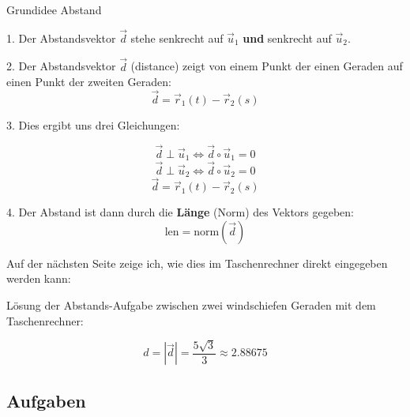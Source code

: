 \begin{rezept}{Grundidee Abstand}{}

  1. Der Abstandsvektor $\vec{d}$ stehe senkrecht auf $\vec{u}_1$
  \textbf{und} senkrecht auf $\vec{u}_2$.

  2. Der Abstandsvektor $\vec{d}$ (distance) zeigt von einem Punkt der einen Geraden auf
  einen Punkt der zweiten Geraden: $$\vec{d}=\vec{r}_1(t) - \vec{r}_2(s)$$

  3. Dies ergibt uns drei Gleichungen:

  $$\vec{d}\perp\vec{u}_1 \Longleftrightarrow{}  \vec{d}\circ{}\vec{u}_1 = 0$$
  $$\vec{d}\perp\vec{u}_2 \Longleftrightarrow{}  \vec{d}\circ{}\vec{u}_2 = 0$$
  $$\vec{d}=\vec{r}_1(t)-\vec{r}_2(s)$$

  4. Der Abstand ist dann durch die \textbf{Länge} (Norm) des Vektors gegeben:
  $$\text{len} = \text{norm}(\vec{d})$$
  
\end{rezept}

Auf der nächsten Seite zeige ich, wie dies im Taschenrechner direkt
eingegeben werden kann:
\newpage

Lösung der Abstands-Aufgabe zwischen zwei windschiefen Geraden mit dem
Taschenrechner:
\TRAINER{}


$$d = |\vec{d} | = \frac{5\sqrt{3}}{3} \approx 2.88675$$
\newpage

\subsection*{Aufgaben}
